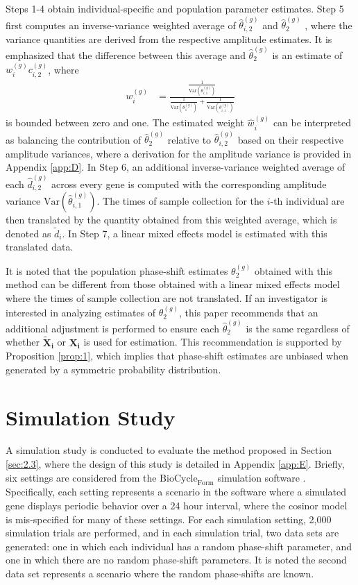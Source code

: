 \noindent Steps 1-4 obtain individual-specific and population parameter estimates. Step 5 first computes an inverse-variance weighted average of $\hat{\theta}_{i,2}^{(g)}$ and $\hat{\theta}_2^{(g)}$ \citep{Cochran1953}, where the variance quantities are derived from the respective amplitude estimates. It is emphasized that the difference between this average and $\hat{\theta}_2^{(g)}$ is an estimate of $w_i^{(g)}c_{i,2}^{(g)}$, where
\begin{align*}
w_{i}^{(g)} &= \frac{\frac{1}{\mathrm{Var}(\theta^{(g)}_{i,1})}}{\frac{1}{\mathrm{Var}(\theta^{(g)}_1)} + \frac{1}{\mathrm{Var}(\theta^{(g)}_{i,1})}}
\end{align*}
is bounded between zero and one. The estimated weight $\hat{w}_{i}^{(g)}$ can be interpreted as balancing the contribution of $\hat{\theta}^{(g)}_2$ relative to $\hat{\theta}^{(g)}_{i,2}$ based on their respective amplitude variances, where a derivation for the amplitude variance is provided in Appendix \ref{app:D}. In Step 6, an additional inverse-variance weighted average of each $\hat{d}_{i,2}^{(g)}$ across every gene is computed with the corresponding amplitude variance $\mathrm{Var}(\hat{\theta}^{(g)}_{i,1})$. The times of sample collection for the $i$-th individual are then translated by the quantity obtained from this weighted average, which is denoted as $\tilde{d}_{i}$. In Step 7, a linear mixed effects model is estimated with this translated data.

It is noted that the population phase-shift estimates $\theta_2^{(g)}$ obtained with this method can be different from those obtained with a linear mixed effects model where the times of sample collection are not translated. If an investigator is interested in analyzing estimates of $\theta_2^{(g)}$, this paper recommends that an additional adjustment is performed to ensure each $\hat{\theta}_2^{(g)}$ is the same regardless of whether $\boldsymbol{\tilde{X}_i}$ or $\boldsymbol{X_i}$ is used for estimation. This recommendation is supported by Proposition \ref{prop:1}, which implies that phase-shift estimates are unbiased when generated by a symmetric probability distribution. 

\section{Simulation Study} \label{sec:3}

A simulation study is conducted to evaluate the method proposed in Section \ref{sec:2.3}, where the design of this study is detailed in Appendix \ref{app:E}. Briefly, six settings are considered from the $\text{BioCycle}_{\text{Form}}$ simulation software \citep{Agostinelli2016, Ceglia2018}. Specifically, each setting represents a scenario in the software where a simulated gene displays periodic behavior over a 24 hour interval, where the cosinor model is mis-specified for many of these settings. For each simulation setting, 2,000 simulation trials are performed, and in each simulation trial, two data sets are generated: one in which each individual has a random phase-shift parameter, and one in which there are no random phase-shift parameters. It is noted the second data set represents a scenario where the random phase-shifts are known. 


